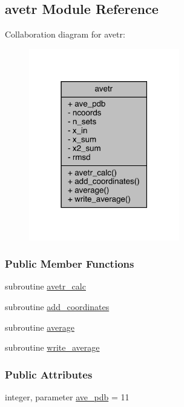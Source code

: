\hypertarget{classavetr}{\subsection{avetr Module Reference}
\label{classavetr}
}


Collaboration diagram for avetr\-:
\nopagebreak
\begin{figure}[H]
\begin{center}
\leavevmode
\includegraphics[width=186pt]{classavetr__coll__graph}
\end{center}
\end{figure}
\subsubsection*{Public Member Functions}
\begin{DoxyCompactItemize}
\item 
subroutine \hyperlink{classavetr_a1fbe6b643dec51fc47c85540a07c896c}{avetr\-\_\-calc}
\item 
subroutine \hyperlink{classavetr_aba7bd71c4ab208ec3f6f9242485c62e9}{add\-\_\-coordinates}
\item 
subroutine \hyperlink{classavetr_a941b904c2c76bdb1041d33b3638767de}{average}
\item 
subroutine \hyperlink{classavetr_abc64c300caa7295a817953c841196d50}{write\-\_\-average}
\end{DoxyCompactItemize}
\subsubsection*{Public Attributes}
\begin{DoxyCompactItemize}
\item 
integer, parameter \hyperlink{classavetr_a9f2db174a302c85d7e01e0290b08d033}{ave\-\_\-pdb} = 11
\end{DoxyCompactItemize}
